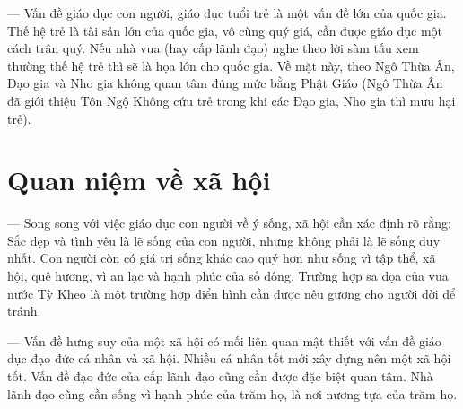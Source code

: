 — Vấn đề giáo dục con người, giáo dục tuổi trẻ là một vấn đề lớn của quốc gia. Thế hệ trẻ là tài sản lớn của quốc gia, vô cùng quý giá, cần được giáo dục một cách trân quý. Nếu nhà vua (hay cấp lãnh đạo) nghe theo lời sàm tấu xem thường thế hệ trẻ thì sẽ là họa lớn cho quốc gia. Về mặt này, theo Ngô Thừa Ân, Đạo gia và Nho gia không quan tâm đúng mức bằng Phật Giáo (Ngô Thừa Ân đã giới thiệu Tôn Ngộ Không cứu trẻ trong khi các Đạo gia, Nho gia thì mưu hại trẻ).

\section{Quan niệm về xã hội} %
\label{sec:78_79_xa_hoi}

— Song song với việc giáo dục con người về ý sống, xã hội cần xác định rõ rằng: Sắc đẹp và tình yêu là lẽ sống của con người, nhưng không phải là lẽ sống duy nhất. Con người còn có giá trị sống khác cao quý hơn như sống vì tập thể, xã hội, quê hương, vì an lạc và hạnh phúc của số đông. Trường hợp sa đọa của vua nước Tỳ Kheo là một trường hợp điển hình cần được nêu gương cho người đời để tránh.

— Vấn đề hưng suy của một xã hội có mối liên quan mật thiết với vấn đề giáo dục đạo đức cá nhân và xã hội. Nhiều cá nhân tốt mới xây dựng nên một xã hội tốt. Vấn đề đạo đức của cấp lãnh đạo cũng cần được đặc biệt quan tâm. Nhà lãnh đạo cũng cần sống vì hạnh phúc của trăm họ, là nơi nương tựa của trăm họ.
